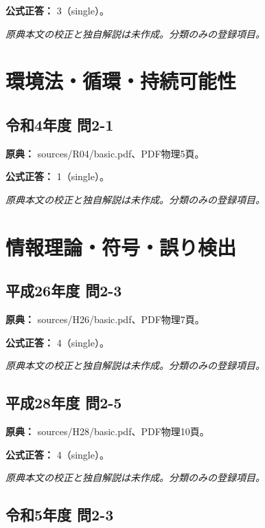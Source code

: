 \textbf{公式正答：} 3（single）。

\par\textit{原典本文の校正と独自解説は未作成。分類のみの登録項目。}

\section{環境法・循環・持続可能性}

\subsection{令和4年度 問2-1}
\label{q:r04-reg-basic-2-1}

\noindent\textbf{原典：} sources/R04/basic.pdf、PDF物理5頁。

\textbf{公式正答：} 1（single）。

\par\textit{原典本文の校正と独自解説は未作成。分類のみの登録項目。}

\section{情報理論・符号・誤り検出}

\subsection{平成26年度 問2-3}
\label{q:h26-reg-basic-2-3}

\noindent\textbf{原典：} sources/H26/basic.pdf、PDF物理7頁。

\textbf{公式正答：} 4（single）。

\par\textit{原典本文の校正と独自解説は未作成。分類のみの登録項目。}

\subsection{平成28年度 問2-5}
\label{q:h28-reg-basic-2-5}

\noindent\textbf{原典：} sources/H28/basic.pdf、PDF物理10頁。

\textbf{公式正答：} 4（single）。

\par\textit{原典本文の校正と独自解説は未作成。分類のみの登録項目。}

\subsection{令和5年度 問2-3}
\label{q:r05-reg-basic-2-3}


